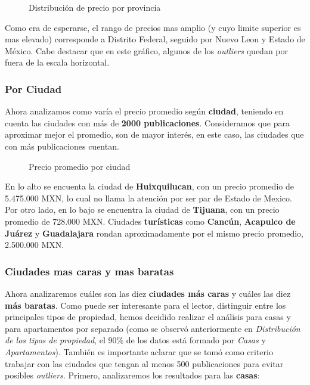 \documentclass[
10pt, %
a4paper, %
oneside, %
headinclude,footinclude, %
BCOR5mm, %
]{scrartcl}
\begin{document}
    \begin{figure}[H]
        \caption{Distribuci\'on de precio por provincia}
        \label{fig:precio-distribucion-provincia}
    \end{figure}
    
    Como era de esperarse, el rango de precios mas amplio (y cuyo limite superior es mas elevado) corresponde a Distrito Federal, seguido por Nuevo Leon y  Estado de México.
    Cabe destacar que en este gráfico, algunos de los \textit{outliers} quedan por fuera de la escala horizontal.
    
\subsubsection{Por Ciudad}
    Ahora analizamos como varía el precio promedio según \textbf{ciudad}, teniendo en cuenta las ciudades con más de \textbf{2000 publicaciones}. Consideramos que para aproximar mejor el promedio, son de mayor interés, en este caso, las ciudades que con más publicaciones cuentan.  
    
        \begin{figure}[H]
        \caption{Precio promedio por ciudad}
        \label{fig:precio-promedio-ciudad}
    \end{figure}
    
    En lo alto se encuenta la ciudad de \textbf{Huixquilucan}, con un precio promedio de 5.475.000 MXN, lo cual no llama la atención por ser par de Estado de Mexico.  Por otro lado, en lo bajo se encuentra la ciudad de \textbf{Tijuana}, con un precio promedio de 728.000 MXN.
    Ciudades \textbf{turísticas} como \textbf{Cancún}, \textbf{Acapulco de Juárez} y \textbf{Guadalajara} rondan aproximadamente por el mismo precio promedio, 2.500.000 MXN.
    
    
    
\subsubsection{Ciudades mas caras y mas baratas}
    Ahora analizaremos cu\'ales son las diez \textbf{ciudades m\'as caras} y cu\'ales las diez \textbf{m\'as baratas}.
    \vskip 2mm
    Como puede ser interesante para el lector, distinguir entre los principales tipos de propiedad, hemos decidido realizar el an\'alisis para casas y para apartamentos por separado (como se observ\'o anteriormente en \textit{Distribuci\'on de los tipos de propiedad}, el 90\% de los datos est\'a formado por \textit{Casas} y \textit{Apartamentos}). Tambi\'en es importante aclarar que se tom\'o como criterio trabajar con las ciudades que tengan al menos 500 publicaciones para evitar posibles \textit{outliers}.
    \vskip 2mm
    Primero, analizaremos los resultados para las \textbf{casas}:
    
\end{document}

